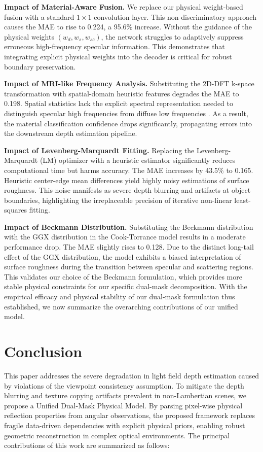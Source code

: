 \documentclass[lettersize,journal]{IEEEtran}
\begin{document}
\textbf{Impact of Material-Aware Fusion.} We replace our physical weight-based fusion with a standard $1\times1$ convolution layer. This non-discriminatory approach causes the MAE to rise to 0.224, a 95.6\% increase. Without the guidance of the physical weights $(w_d, w_s, w_{sc})$, the network struggles to adaptively suppress erroneous high-frequency specular information. This demonstrates that integrating explicit physical weights into the decoder \cite{ronneberger2015} is critical for robust boundary preservation.

\textbf{Impact of MRI-like Frequency Analysis.} Substituting the 2D-DFT k-space transformation with spatial-domain heuristic features degrades the MAE to 0.198. Spatial statistics lack the explicit spectral representation needed to distinguish specular high frequencies from diffuse low frequencies \cite{he2016}. As a result, the material classification confidence drops significantly, propagating errors into the downstream depth estimation pipeline.

\textbf{Impact of Levenberg-Marquardt Fitting.} Replacing the Levenberg-Marquardt (LM) optimizer with a heuristic estimator significantly reduces computational time but harms accuracy. The MAE increases by 43.5\% to 0.165. Heuristic center-edge mean differences yield highly noisy estimations of surface roughness. This noise manifests as severe depth blurring and artifacts at object boundaries, highlighting the irreplaceable precision of iterative non-linear least-squares fitting.

\textbf{Impact of Beckmann Distribution.} Substituting the Beckmann distribution with the GGX distribution in the Cook-Torrance model results in a moderate performance drop. The MAE slightly rises to 0.128. Due to the distinct long-tail effect of the GGX distribution, the model exhibits a biased interpretation of surface roughness during the transition between specular and scattering regions. This validates our choice of the Beckmann formulation, which provides more stable physical constraints for our specific dual-mask decomposition. With the empirical efficacy and physical stability of our dual-mask formulation thus established, we now summarize the overarching contributions of our unified model.

\section{Conclusion}

This paper addresses the severe degradation in light field depth estimation caused by violations of the viewpoint consistency assumption. To mitigate the depth blurring and texture copying artifacts prevalent in non-Lambertian scenes, we propose a Unified Dual-Mask Physical Model. By parsing pixel-wise physical reflection properties from angular observations, the proposed framework replaces fragile data-driven dependencies with explicit physical priors, enabling robust geometric reconstruction in complex optical environments. The principal contributions of this work are summarized as follows:
\end{document}
